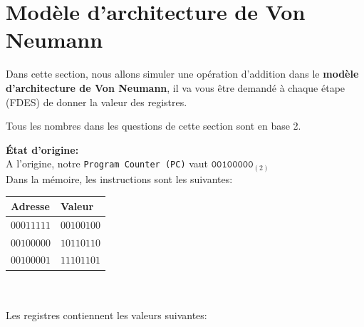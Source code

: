 \begin{Exercice}[15 minutes]

\end{Exercice}
\newpage
\section{Modèle d'architecture de Von Neumann}
Dans cette section, nous allons simuler une opération d'addition dans le \textbf{modèle d'architecture de Von Neumann}, il va vous être demandé à chaque étape (FDES) de donner la valeur des registres.\\

\begin{attention}
Tous les nombres dans les questions de cette section sont en base 2.
\end{attention}

\textbf{État d'origine:}\\
A l'origine, notre \lstinline{Program Counter (PC)} vaut $\texttt{00100000}_{(2)}$ \\ %

Dans la mémoire, les instructions sont les suivantes:

\begin{tabular}{| C{0.13\textwidth} | C{0.13\textwidth} |} 
    \hline
    \textbf{Adresse} & \textbf{Valeur}\\ [0.5ex]
    \hline
    $00011111$ & $00100100$\\ [0.5ex] 
    \hline
    $00100000$ & $10110110$\\ [0.5ex] 
    \hline
    $00100001$ & $11101101$\\ [0.5ex]
    \hline
\end{tabular}
\\\\
Les registres contiennent les valeurs suivantes:

